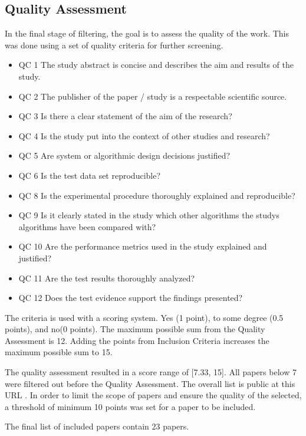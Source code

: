 \subsection{Quality Assessment}
In the final stage of filtering, the goal is to assess the quality of the work.
This was done using a set of quality criteria for further screening. 
\begin{itemize}
    \item QC 1	The study abstract is concise and describes the aim and results of the study.
    \item QC 2	The publisher of the paper / study is a respectable scientific source.
    \item QC 3	Is there a clear statement of the aim of the research?
    \item QC 4	Is the study put into the context of other studies and research?
    \item QC 5	Are system or algorithmic design decisions justified?
    \item QC 6	Is the test data set reproducible?
    \item QC 8	Is the experimental procedure thoroughly explained and reproducible?
    \item QC 9	Is it clearly stated in the study which other algorithms the studys algorithms have been compared with?
    \item QC 10	Are the performance metrics used in the study explained and justified?
    \item QC 11	Are the test results thoroughly analyzed?
    \item QC 12 Does the test evidence support the findings presented?
\end{itemize}

The criteria is used with a scoring system.
Yes (1 point), to some degree (0.5 points), and no(0 points).
The maximum possible sum from the Quality Assessment is 12. Adding the points from Inclusion Criteria 
increases the maximum possible sum to 15.

The quality assessment resulted in a score range of [7.33, 15]. All papers below 7 were filtered out before 
the Quality Assessment.
The overall list is public at this URL \cite{SLR-cutoff}.
In order to limit the scope of papers and ensure the quality of the selected, a threshold of minimum 10 points
was set for a paper to be included.

The final list of included papers contain 23 papers.